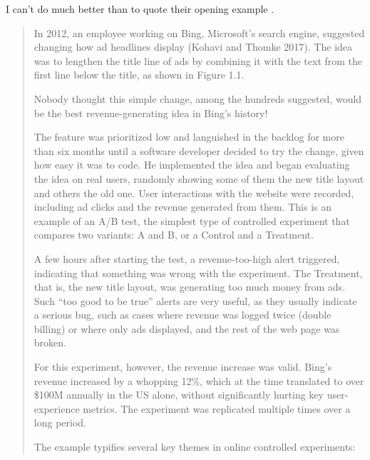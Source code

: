 \documentclass[
]{book}
\begin{document}
I can't do much better than to quote their opening example \citet[p.~3]{kohavi}.

\begin{quote}
In 2012, an employee working on Bing, Microsoft's search engine, suggested changing how ad headlines display (Kohavi and Thomke 2017). The idea was to lengthen the title line of ads by combining it with the text from the first line below the title, as shown in Figure 1.1.

Nobody thought this simple change, among the hundreds suggested, would be the best revenue-generating idea in Bing's history!

The feature was prioritized low and languished in the backlog for more than six months until a software developer decided to try the change, given how easy it was to code. He implemented the idea and began evaluating the idea on real users, randomly showing some of them the new title layout and others the old one. User interactions with the website were recorded, including ad clicks and the revenue generated from them. This is an example of an A/B test, the simplest type of controlled experiment that compares two variants: A and B, or a Control and a Treatment.

A few hours after starting the test, a revenue-too-high alert triggered, indicating that something was wrong with the experiment. The Treatment, that is, the new title layout, was generating too much money from ads. Such ``too good to be true'' alerts are very useful, as they usually indicate a serious bug, such as cases where revenue was logged twice (double billing) or where only ads displayed, and the rest of the web page was broken.

For this experiment, however, the revenue increase was valid. Bing's revenue increased by a whopping 12\%, which at the time translated to over \$100M annually in the US alone, without significantly hurting key user-experience metrics. The experiment was replicated multiple times over a long period.

The example typifies several key themes in online controlled experiments:


\end{quote}
\end{document}
